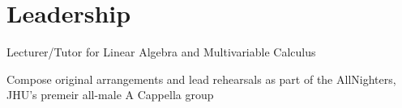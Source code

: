 \section{Leadership}

{Lecturer/Tutor for Linear Algebra and Multivariable Calculus}

{Compose original arrangements and lead rehearsals as part of the AllNighters, JHU's premeir all-male A Cappella group}